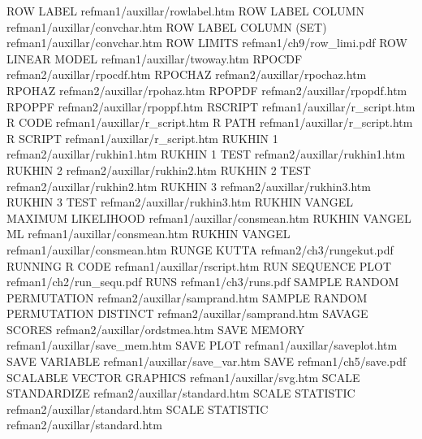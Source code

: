 ROW LABEL                               refman1/auxillar/rowlabel.htm
ROW LABEL COLUMN                        refman1/auxillar/convchar.htm
ROW LABEL COLUMN (SET)                  refman1/auxillar/convchar.htm
ROW LIMITS                              refman1/ch9/row_limi.pdf
ROW LINEAR MODEL                        refman1/auxillar/twoway.htm
RPOCDF                                  refman2/auxillar/rpocdf.htm
RPOCHAZ                                 refman2/auxillar/rpochaz.htm
RPOHAZ                                  refman2/auxillar/rpohaz.htm
RPOPDF                                  refman2/auxillar/rpopdf.htm
RPOPPF                                  refman2/auxillar/rpoppf.htm
RSCRIPT                                 refman1/auxillar/r_script.htm
R CODE                                  refman1/auxillar/r_script.htm
R PATH                                  refman1/auxillar/r_script.htm
R SCRIPT                                refman1/auxillar/r_script.htm
RUKHIN 1                                refman2/auxillar/rukhin1.htm
RUKHIN 1 TEST                           refman2/auxillar/rukhin1.htm
RUKHIN 2                                refman2/auxillar/rukhin2.htm
RUKHIN 2 TEST                           refman2/auxillar/rukhin2.htm
RUKHIN 3                                refman2/auxillar/rukhin3.htm
RUKHIN 3 TEST                           refman2/auxillar/rukhin3.htm
RUKHIN VANGEL MAXIMUM LIKELIHOOD        refman1/auxillar/consmean.htm
RUKHIN VANGEL ML                        refman1/auxillar/consmean.htm
RUKHIN VANGEL                           refman1/auxillar/consmean.htm
RUNGE KUTTA                             refman2/ch3/rungekut.pdf
RUNNING R CODE                          refman1/auxillar/rscript.htm
RUN SEQUENCE PLOT                       refman1/ch2/run_sequ.pdf
RUNS                                    refman1/ch3/runs.pdf
SAMPLE RANDOM PERMUTATION               refman2/auxillar/samprand.htm
SAMPLE RANDOM PERMUTATION DISTINCT      refman2/auxillar/samprand.htm
SAVAGE SCORES                           refman2/auxillar/ordstmea.htm
SAVE MEMORY                             refman1/auxillar/save_mem.htm
SAVE PLOT                               refman1/auxillar/saveplot.htm
SAVE VARIABLE                           refman1/auxillar/save_var.htm
SAVE                                    refman1/ch5/save.pdf
SCALABLE VECTOR GRAPHICS                refman1/auxillar/svg.htm
SCALE STANDARDIZE                       refman2/auxillar/standard.htm
SCALE STATISTIC                         refman2/auxillar/standard.htm
SCALE STATISTIC                         refman2/auxillar/standard.htm
